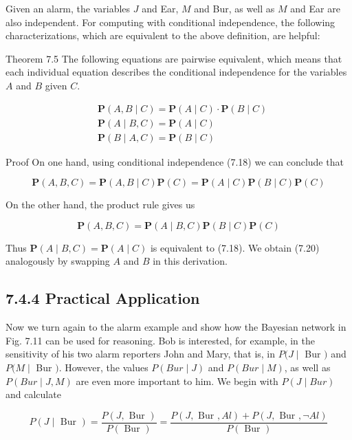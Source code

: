 \documentclass[10pt]{article}
\begin{document}
Given an alarm, the variables $J$ and Ear, $M$ and Bur, as well as $M$ and Ear are also independent. For computing with conditional independence, the following characterizations, which are equivalent to the above definition, are helpful:

Theorem 7.5 The following equations are pairwise equivalent, which means that each individual equation describes the conditional independence for the variables $A$ and $B$ given $C$.


\begin{align*}
& \boldsymbol{P}(A, B \mid C)=\boldsymbol{P}(A \mid C) \cdot \boldsymbol{P}(B \mid C)  \tag{7.18}\\
& \boldsymbol{P}(A \mid B, C)=\boldsymbol{P}(A \mid C)  \tag{7.19}\\
& \boldsymbol{P}(B \mid A, C)=\boldsymbol{P}(B \mid C) \tag{7.20}
\end{align*}


Proof On one hand, using conditional independence (7.18) we can conclude that

$$
\boldsymbol{P}(A, B, C)=\boldsymbol{P}(A, B \mid C) \boldsymbol{P}(C)=\boldsymbol{P}(A \mid C) \boldsymbol{P}(B \mid C) \boldsymbol{P}(C)
$$

On the other hand, the product rule gives us

$$
\boldsymbol{P}(A, B, C)=\boldsymbol{P}(A \mid B, C) \boldsymbol{P}(B \mid C) \boldsymbol{P}(C)
$$

Thus $\boldsymbol{P}(A \mid B, C)=\boldsymbol{P}(A \mid C)$ is equivalent to (7.18). We obtain (7.20) analogously by swapping $A$ and $B$ in this derivation.

\subsection*{7.4.4 Practical Application}
Now we turn again to the alarm example and show how the Bayesian network in Fig. 7.11 can be used for reasoning. Bob is interested, for example, in the sensitivity of his two alarm reporters John and Mary, that is, in $P(J \mid$ Bur $)$ and $P(M \mid$ Bur $)$. However, the values $P(B u r \mid J)$ and $P(B u r \mid M)$, as well as $P(B u r \mid J, M)$ are even more important to him. We begin with $P(J \mid B u r)$ and calculate


\begin{equation*}
P(J \mid \text { Bur })=\frac{P(J, \text { Bur })}{P(\text { Bur })}=\frac{P(J, \text { Bur }, A l)+P(J, \text { Bur }, \neg A l)}{P(\text { Bur })} \tag{7.21}
\end{equation*}
\end{document}
